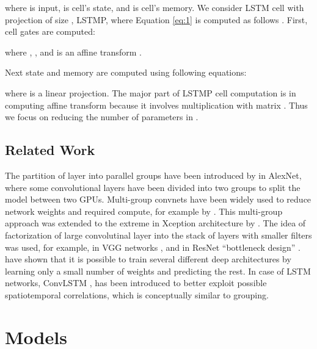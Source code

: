 \documentclass{article} \usepackage{iclr2017_workshop,times}
\begin{document}
where  is input,  is cell's state, and  is cell's memory. We consider LSTM cell with projection of size , LSTMP, where Equation \ref{eq:1} is computed as follows \citep{sak2014long, zaremba2014recurrent}.
 First, cell gates  are computed:

where , , and  is an affine transform . 

Next state  and memory  are computed using following equations:

where  is a linear projection. The major part of LSTMP cell computation is in computing affine transform  because it involves multiplication with  matrix . Thus we focus on reducing the number of parameters in .

\subsection{Related Work}
The partition of layer into parallel groups have been introduced by \citet{krizhevsky2012imagenet} in AlexNet, where some convolutional layers have been divided into two groups to split the model between two GPUs.  Multi-group convnets have been widely used to reduce network weights and required compute, for example by \citet{esser2016convolutional}. This multi-group approach was extended to the extreme in  Xception architecture by \citet{chollet2016xception}.
The idea of factorization of large convolutinal layer into the stack of layers with smaller filters was used, for example, in VGG networks \citep{simonyan2014very}, and in ResNet ``bottleneck design'' \citep{He_2016_CVPR}. \citet{denil2013predicting} have shown that it is possible to train several different deep architectures by learning only a small number of weights and predicting the rest.
In case of LSTM networks, ConvLSTM \citep{Shi:2015:CLN:2969239.2969329}, has been introduced to better exploit possible spatiotemporal correlations, which is conceptually similar to grouping.

\section{Models}
\end{document}
